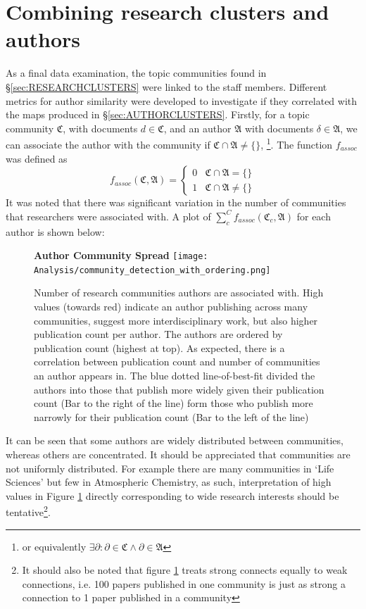 \section{Combining research clusters and authors}
As a final data examination, the topic communities found in  \S\ref{sec:RESEARCHCLUSTERS} were linked to the staff members. Different metrics for author similarity were developed to investigate if they correlated with the maps produced in \S\ref{sec:AUTHORCLUSTERS}.
Firstly, for a topic community $\mathfrak{C}$, with documents $d \in \mathfrak{C}$, and an author $\mathfrak{A}$ with documents $\delta \in \mathfrak{A}$, we can associate the author with the community if $\mathfrak{C} \cap \mathfrak{A} \neq \{ \}$, \footnote{or equivalently $\exists  \partial : \partial \in \mathfrak{C} \wedge \partial \in \mathfrak{A} $}. The function $f_{assoc}$ was defined as 
\[ 
f_{assoc}\left( \mathfrak{C} , \mathfrak{A} \right) = \begin{cases} 
      0 & \mathfrak{C} \cap \mathfrak{A} = \{ \} \\
      1 & \mathfrak{C} \cap \mathfrak{A} \neq \{ \} 
   \end{cases}
\]
It was noted that there was significant variation in the number of communities that researchers were associated with. A plot of $\sum_c^C f_{assoc} \left( \mathfrak{C}_c , \mathfrak{A} \right)$ for each author is shown below:
\begin{center}
\begin{figure}[H]
  \centering
  \textbf{Author Community Spread}
    \texttt{[image: Analysis/community\_detection\_with\_ordering.png]}
    \caption[Author community Spread]{Number of research communities authors are associated with. High values (towards red) indicate an author publishing across many communities, suggest more interdisciplinary work, but also higher publication count per author. The authors are ordered by publication count (highest at top). As expected, there is a correlation between publication count and number of communities an author appears in. The blue dotted line-of-best-fit divided the authors into those that publish more widely given their publication count (Bar to the right of the line) form those who publish more narrowly for their publication count (Bar to the left of the line)}
\label{fig:commbar}

\end{figure} 
\end{center}
It can be seen that some authors are widely distributed between communities, whereas others are concentrated.
It should be appreciated that communities are not uniformly distributed. For example there are many communities in `Life Sciences' but few in Atmospheric Chemistry, as such, interpretation of high values in Figure \ref{fig:commbar} directly corresponding to wide research interests should be tentative\footnote{It should also be noted that figure \ref{fig:commbar} treats strong connects equally to weak connections, i.e. 100 papers published in one community is just as strong a connection to 1 paper published in a community}.

